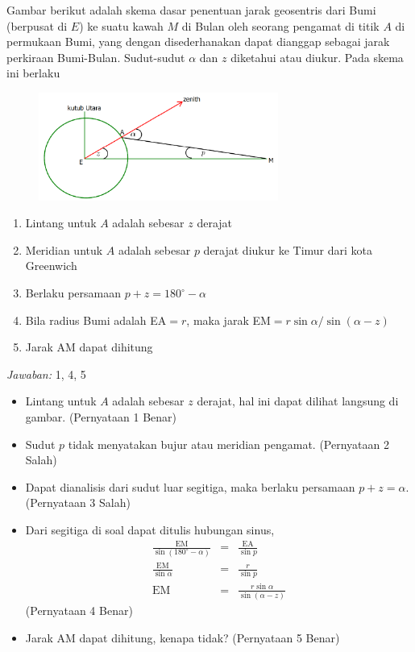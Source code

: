\documentclass[11pt,fleqn]{exam}
\begin{document}
\begin{questions}
\vspace{0.5cm}
\question Gambar berikut adalah skema dasar penentuan jarak geosentris dari Bumi (berpusat di $E$) ke suatu kawah $M$ di Bulan oleh seorang pengamat di titik $A$ di permukaan Bumi, yang dengan disederhanakan dapat dianggap sebagai jarak perkiraan Bumi-Bulan. Sudut-sudut $\alpha$ dan $z$ diketahui atau diukur. Pada skema ini berlaku
\begin{figure}[H]
\centering
\includegraphics[width=0.7\textwidth]{osp2022_17.png}
\label{fig:osp2022_17}
\end{figure}
\begin{enumerate}
\item Lintang untuk $A$ adalah sebesar $z$ derajat
\item Meridian untuk $A$ adalah sebesar $p$ derajat diukur ke Timur dari kota Greenwich
\item Berlaku persamaan $p + z = 180^{\circ} - \alpha$
\item Bila radius Bumi adalah EA$ = r$, maka jarak EM$ = r\sin{\alpha}/\sin{(\alpha - z)}$
\item Jarak AM dapat dihitung
\end{enumerate}

\bigskip
\textit{Jawaban: } 1, 4, 5

\begin{itemize}
\item Lintang untuk $A$ adalah sebesar $z$ derajat, hal ini dapat dilihat langsung di gambar. (Pernyataan 1 Benar)
\item Sudut $p$ tidak menyatakan bujur atau meridian pengamat. (Pernyataan 2 Salah)
\item Dapat dianalisis dari sudut luar segitiga, maka berlaku persamaan $p + z = \alpha$. (Pernyataan 3 Salah)
\item Dari segitiga di soal dapat ditulis hubungan sinus,
\begin{eqnarray*}
    \frac{\text{EM}}{\sin(180^{\circ}-\alpha)} &=& \frac{\text{EA}}{\sin{p}}\\
    \frac{\text{EM}}{\sin{\alpha}} &=& \frac{r}{\sin{p}}\\
    \text{EM} &=& \frac{r \sin{\alpha} }{\sin{(\alpha - z)}}
\end{eqnarray*}
(Pernyataan 4 Benar)
\item Jarak AM dapat dihitung, kenapa tidak? (Pernyataan 5 Benar)
\end{itemize}


\end{questions}
\end{document}
